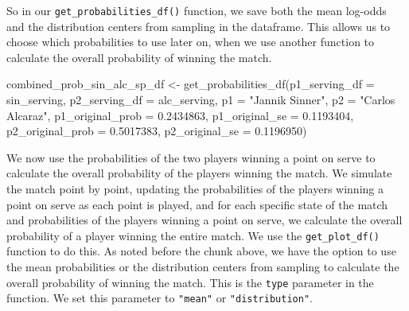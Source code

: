 \documentclass[
  letterpaper,
  DIV=11,
  numbers=noendperiod]{scrartcl}
\newenvironment{Shaded}{\begin{snugshade}}{\end{snugshade}}
\newcommand{\AttributeTok}[1]{\textcolor[rgb]{0.40,0.45,0.13}{#1}}
\newcommand{\FloatTok}[1]{\textcolor[rgb]{0.68,0.00,0.00}{#1}}
\newcommand{\FunctionTok}[1]{\textcolor[rgb]{0.28,0.35,0.67}{#1}}
\newcommand{\NormalTok}[1]{\textcolor[rgb]{0.00,0.23,0.31}{#1}}
\newcommand{\OtherTok}[1]{\textcolor[rgb]{0.00,0.23,0.31}{#1}}
\newcommand{\StringTok}[1]{\textcolor[rgb]{0.13,0.47,0.30}{#1}}
\begin{document}
So in our \texttt{get\_probabilities\_df()} function, we save both the
mean log-odds and the distribution centers from sampling in the
dataframe. This allows us to choose which probabilities to use later on,
when we use another function to calculate the overall probability of
winning the match.

\linespread{0.9}

\begin{Shaded}
\begin{Highlighting}[]
\NormalTok{combined\_prob\_sin\_alc\_sp\_df }\OtherTok{\textless{}{-}} \FunctionTok{get\_probabilities\_df}\NormalTok{(}\AttributeTok{p1\_serving\_df =}\NormalTok{ sin\_serving,}
                                 \AttributeTok{p2\_serving\_df =}\NormalTok{ alc\_serving,}
                                 \AttributeTok{p1 =} \StringTok{"Jannik Sinner"}\NormalTok{,}
                                 \AttributeTok{p2 =} \StringTok{"Carlos Alcaraz"}\NormalTok{,}
                                 \AttributeTok{p1\_original\_prob =} \FloatTok{0.2434863}\NormalTok{,}
                                 \AttributeTok{p1\_original\_se =} \FloatTok{0.1193404}\NormalTok{,}
                                 \AttributeTok{p2\_original\_prob =} \FloatTok{0.5017383}\NormalTok{,}
                                 \AttributeTok{p2\_original\_se =} \FloatTok{0.1196950}\NormalTok{)}
\end{Highlighting}
\end{Shaded}

\linespread{2}

We now use the probabilities of the two players winning a point on serve
to calculate the overall probability of the players winning the match.
We simulate the match point by point, updating the probabilities of the
players winning a point on serve as each point is played, and for each
specific state of the match and probabilities of the players winning a
point on serve, we calculate the overall probability of a player winning
the entire match. We use the \texttt{get\_plot\_df()} function to do
this. As noted before the chunk above, we have the option to use the
mean probabilities or the distribution centers from sampling to
calculate the overall probability of winning the match. This is the
\texttt{type} parameter in the function. We set this parameter to
\texttt{"mean"} or \texttt{"distribution"}.

\linespread{0.9}
\end{document}
